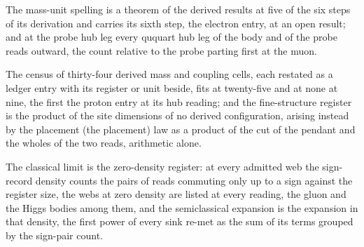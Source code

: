 \begin{chwall}\label{box:I-6-read-at-a-register-the-probe-and-the-measurement:3}
The mass-unit spelling is a theorem of the derived results at five of the six steps of its derivation and carries its sixth step, the electron entry, at an open result; and at the probe hub leg every ququart hub leg of the body and of the probe reads outward, the count relative to the probe parting first at the muon.
\end{chwall}
\begin{chwall}\label{box:I-6-read-at-a-register-the-probe-and-the-measurement:4}
The census of thirty-four derived mass and coupling cells, each restated as a ledger entry with its register or unit beside, fits at twenty-five and at none at nine, the first the proton entry at its hub reading; and the fine-structure register is the product of the site dimensions of no derived configuration, arising instead by the placement (the placement) law as a product of the cut of the pendant and the wholes of the two reads, arithmetic alone.
\end{chwall}
\begin{chtheorem}\label{box:I-6-read-at-a-register-the-probe-and-the-measurement:5}
The classical limit is the zero-density register: at every admitted web the sign-record density counts the pairs of reads commuting only up to a sign against the register size, the webs at zero density are listed at every reading, the gluon and the Higgs bodies among them, and the semiclassical expansion is the expansion in that density, the first power of every sink re-met as the sum of its terms grouped by the sign-pair count.
\end{chtheorem}

